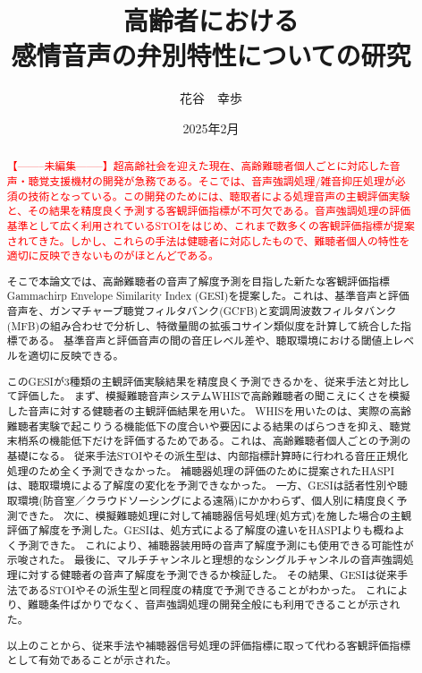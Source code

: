 \documentclass[11pt]{jreport}
\title{高齢者における\\感情音声の弁別特性についての研究}
\author{花谷　幸歩}
\date{2025年2月}	%
\begin{document}
\maketitle



\begin{abstract}
\textcolor{red}{【--------未編集--------】超高齢社会を迎えた現在、高齢難聴者個人ごとに対応した音声・聴覚支援機材の開発が急務である。そこでは、音声強調処理/雑音抑圧処理が必須の技術となっている。この開発のためには、聴取者による処理音声の主観評価実験と、その結果を精度良く予測する客観評価指標が不可欠である。音声強調処理の評価基準として広く利用されているSTOIをはじめ、これまで数多くの客観評価指標が提案されてきた。しかし、これらの手法は健聴者に対応したもので、難聴者個人の特性を適切に反映できないものがほとんどである。}

そこで本論文では、高齢難聴者の音声了解度予測を目指した新たな客観評価指標Gammachirp Envelope Similarity Index (GESI)を提案した。これは、基準音声と評価音声を、ガンマチャープ聴覚フィルタバンク(GCFB)と変調周波数フィルタバンク(MFB)の組み合わせで分析し、特徴量間の拡張コサイン類似度を計算して統合した指標である。
基準音声と評価音声の間の音圧レベル差や、聴取環境における閾値上レベルを適切に反映できる。

このGESIが3種類の主観評価実験結果を精度良く予測できるかを、従来手法と対比して評価した。
まず、模擬難聴音声システムWHISで高齢難聴者の聞こえにくさを模擬した音声に対する健聴者の主観評価結果を用いた。
WHISを用いたのは、実際の高齢難聴者実験で起こりうる機能低下の度合いや要因による結果のばらつきを抑え、聴覚末梢系の機能低下だけを評価するためである。これは、高齢難聴者個人ごとの予測の基礎になる。
従来手法STOIやその派生型は、内部指標計算時に行われる音圧正規化処理のため全く予測できなかった。
補聴器処理の評価のために提案されたHASPIは、聴取環境による了解度の変化を予測できなかった。
一方、GESIは話者性別や聴取環境(防音室／クラウドソーシングによる遠隔)にかかわらず、個人別に精度良く予測できた。
次に、模擬難聴処理に対して補聴器信号処理(処方式)を施した場合の主観評価了解度を予測した。GESIは、処方式による了解度の違いをHASPIよりも概ねよく予測できた。
これにより、補聴器装用時の音声了解度予測にも使用できる可能性が示唆された。
最後に、マルチチャンネルと理想的なシングルチャンネルの音声強調処理に対する健聴者の音声了解度を予測できるか検証した。
その結果、GESIは従来手法であるSTOIやその派生型と同程度の精度で予測できることがわかった。
これにより、難聴条件ばかりでなく、音声強調処理の開発全般にも利用できることが示された。

以上のことから、従来手法や補聴器信号処理の評価指標に取って代わる客観評価指標として有効であることが示された。


\end{abstract}
\end{document}
